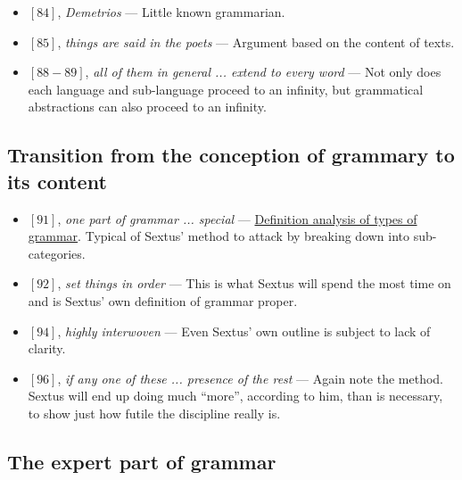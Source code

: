 \documentclass[12pt]{article}
\begin{document}
\begin{itemize}
\item $[84]$, \textit{Demetrios} --- Little known grammarian.

\item $[85]$, \textit{things are said in the poets} --- Argument based on the content of texts.

\item $[88-89]$, \textit{all of them in general ... extend to every word} --- Not only does each language and sub-language proceed to an infinity, but grammatical abstractions can also proceed to an infinity.

\end{itemize}

\subsection{Transition from the conception of grammary to its content}

\begin{itemize}

\item $[91]$, \textit{one part of grammar ... special} --- \ul{Definition analysis of types of grammar}. Typical of Sextus' method to attack by breaking down into sub-categories.

\item $[92]$, \textit{set things in order} --- This is what Sextus will spend the most time on and is Sextus' own definition of grammar proper.

\item $[94]$, \textit{highly interwoven} --- Even Sextus' own outline is subject to lack of clarity.

\item $[96]$, \textit{if any one of these ... presence of the rest} --- Again note the method. Sextus will end up doing much ``more'', according to him, than is necessary, to show just how futile the discipline really is.

\end{itemize}

\subsection{The expert part of grammar}
\end{document}
